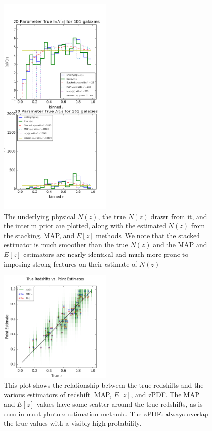 \documentclass[preprint]{aastex}
\begin{document}
\begin{figure}
\includegraphics[width=0.5\textwidth]{null/trueNz.png}
\caption{The underlying physical $N(z)$, the true $N(z)$ drawn from it, and the 
interim prior are plotted, along with the estimated $N(z)$ from the stacking, 
MAP, and $E[z]$ methods.  We note that the stacked estimator is much smoother 
than the true $N(z)$ and the MAP and $E[z]$ estimators are nearly identical and 
much more prone to imposing strong features on their estimate of $N(z)$}
\label{fig:nulltrueNz}
\end{figure}

\begin{figure}
\includegraphics[width=0.5\textwidth]{null/truevmap.png}
\caption{This plot shows the relationship between the true redshifts and the 
various estimators of redshift, MAP, $E[z]$, and zPDF.  The MAP and $E[z]$ 
values have some scatter around the true redshifts, as is seen in most photo-z 
estimation methods.  The zPDFs always overlap the true values with a visibly 
high probability.}
\label{fig:nullcat}
\end{figure}
\end{document}
